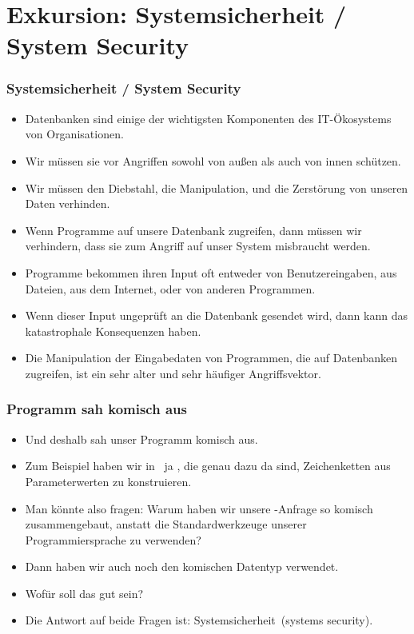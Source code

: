 \documentclass[aspectratio=169,mathserif,notheorems]{beamer}%
\begin{document}
\section{Exkursion: Systemsicherheit / System Security}
%
\begin{frame}%
\frametitle{Systemsicherheit / System Security}%
\begin{itemize}%
\item Datenbanken sind einige der wichtigsten Komponenten des IT-Ökosystems von Organisationen.%
\item<2-> Wir müssen sie vor Angriffen sowohl von außen als auch von innen schützen.%
\item<3-> Wir müssen den Diebstahl, die Manipulation, und die Zerstörung von unseren Daten verhinden.%
\item<4-> Wenn Programme auf unsere Datenbank zugreifen, dann müssen wir verhindern, dass sie zum Angriff auf unser System misbraucht werden.%
\item<5-> Programme bekommen ihren Input oft entweder von Benutzereingaben, aus Dateien, aus dem Internet, oder von anderen Programmen.%
\item<6-> Wenn dieser Input ungeprüft an die Datenbank gesendet wird, dann kann das katastrophale Konsequenzen haben.%
\item<7-> Die Manipulation der Eingabedaten von Programmen, die auf Datenbanken zugreifen, ist ein sehr alter und sehr häufiger Angriffsvektor\cite{S2008SI}.%
\end{itemize}%
\end{frame}%
%
\begin{frame}%
\frametitle{Programm sah komisch aus}%
\begin{itemize}%
\item Und deshalb sah unser Programm komisch aus.%
\item<2-> Zum Beispiel haben wir in \python\ ja , die genau dazu da sind, Zeichenketten aus Parameterwerten zu konstruieren.%
\item<3-> Man könnte also fragen: Warum haben wir unsere -Anfrage so komisch zusammengebaut, anstatt die Standardwerkzeuge unserer Programmiersprache zu verwenden?%
\item<4-> Dann haben wir auch noch den komischen Datentyp  verwendet.%
\item<5-> Wofür soll das gut sein?%
\item<6-> Die Antwort auf beide Fragen ist: \alert{Systemsicherheit}~(systems security).%
\end{itemize}%
\end{frame}%
\end{document}
